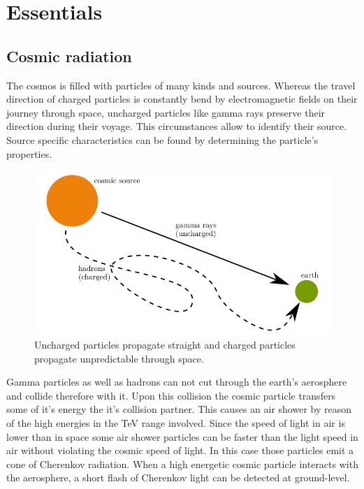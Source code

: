 \chapter{Essentials}


\section{Cosmic radiation}
The cosmos is filled with particles of many kinds and sources.
Whereas the travel direction of charged particles is constantly bend by electromagnetic fields on their journey through space,
uncharged particles like gamma rays preserve their direction during their voyage.
This circumstances allow to identify their source.
Source specific characteristics can be found by determining the particle's properties.

\begin{figure}
    \centering
    \includegraphics[scale=1]{Plots/Cosmic_Radiation.pdf}
    \caption{Uncharged particles propagate straight and charged particles propagate unpredictable through space.}
    \label{fig:cosmic_radiation}
\end{figure}

Gamma particles as well as hadrons can not cut through the earth's aerosphere and collide therefore with it.
Upon this collision the cosmic particle transfers some of it's energy the it's collision partner.
This causes an air shower by reason of the high energies in the \si{\tera\eV} range involved.
Since the speed of light in air is lower than in space some air shower particles can be faster than the light speed in air
without violating the cosmic speed of light.
In this case those particles emit a cone of Cherenkov radiation.
When a high energetic cosmic particle interacts with the aerosphere, a short flash of Cherenkov light can be detected at ground-level.

